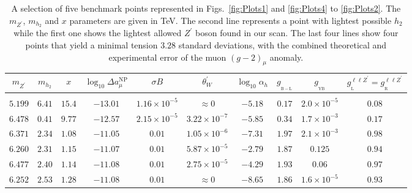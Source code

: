\documentclass[10pt]{report}
\newcommand{\g}[2]{g_{_\mathrm{#1}}^{#2}}
\newcommand{\ro}[1]{\textrm{#1}}
\begin{document}
\begin{table}[htb!]
\begin{center}
		\begin{tabular}{cccccccccc}
			$m_{Z^\prime}$ & $m_{h_2}$ &  $x$& $ \log_{10} \Delta a_\mu^{\ro{NP}}$ & $\sigma B$ & $\theta_W^\prime$ & $\log_{10}\alpha_h$ & $\g{B-L}{}$ & $\g{YB}{}$ & 
			$ \g{L}{\ell \ell Z^\prime} = \g{R}{\ell \ell Z^\prime}$ %
			\vspace{1mm}
			\\
			\hline \vspace{-1mm} \\ 
$5.199$    & $6.41$     & $15.4$    & $-13.01$       & $1.16 \times 10^{-5}$   & $\approx 0$                    & $-5.18$     & $0.17$   & $2.0\times 10^{-5}$    & $0.08$  %
\vspace{1mm}  \\ 
$6.478$    & $0.41$     & $9.77$    & $-12.57$       & $2.15 \times 10^{-5}$   & $3.22\times 10^{-7}$      & $-5.85$     & $0.34$   & $1.7\times 10^{-3}$    & $0.17$  %
\vspace{1mm}   \\ 
$6.371$    & $2.34$     & $1.08$   & $-11.05$        & $0.01$                           & $1.05\times 10^{-6}$      & $-7.31$     & $1.97$   & $2.1\times 10^{-3}$    & $0.98$   %
\vspace{1mm}    \\ 
$6.260$    & $2.31$     & $1.15$   & $-11.07$        & $0.01$                           & $5.87\times 10^{-5}$      & $-2.79$     & $1.87$   & $0.125$                        & $0.94$  %
\vspace{1mm}   \\ 
$6.477$    & $2.40$      & $1.14$   & $-11.08$       & $0.01$                           & $2.75\times 10^{-5}$      & $-4.29$     & $1.93$   & $0.06$                          & $0.97$  %
\vspace{1mm}    \\ 
$6.252$    & $2.53$     & $1.28$   & $-11.08$        & $0.01$                           & $\approx 0$                    & $-8.65$     & $1.86$   & $1.6\times 10^{-5}$     & $0.93$   %
\vspace{1mm}   \\ 
\end{tabular}
		\caption{A selection of five benchmark points represented in Figs.~\ref{fig:Plots1} and \ref{fig:Plots4} to \ref{fig:Plots2}. The $m_{Z^\prime}$, $m_{h_2}$ and $x$ parameters are given in TeV. The second line represents a point with lightest possible $h_2$ while the first one shows the lightest allowed $Z^\prime$ boson found in our scan. The last four lines show four points that yield 
a minimal tension $3.28$ standard deviations, with the combined theoretical and experimental error of the muon $(g-2)_\mu$ anomaly.}
		\label{tab:bench}
\end{center}
\end{table}
\setlength{\tabcolsep}{6pt} %
\renewcommand{\arraystretch}{1} %
%
\end{document}
